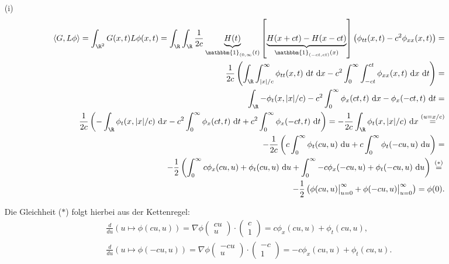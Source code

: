 \begin{solution}

\phantom{}
\begin{itemize}
    \item[(i)] \begin{align*}
    \langle G, L\phi \rangle =
    \int_{\R^2} G(x, t) L\phi(x, t) =
    \int_{\R} \int_{\R} \frac{1}{2c} \underbrace{H(t)}_{\mathbbm{1}_{(0, \infty}(t)}\left[ \underbrace{H(x+ct) - H(x-ct)}_{\mathbbm{1}_{(-ct, ct)}(x)}\right] \left( \phi_{tt}(x, t) - c^2 \phi_{xx}(x, t) \right) = \\
    \frac{1}{2c} \left(
    \int_\R \int_{|x|/c}^\infty \phi_{tt}(x, t) \mathrm{~d}t \mathrm{~d}x
    - c^2 \int_0^\infty \int_{-ct}^{ct} \phi_{xx}(x, t) \mathrm{~d}x \mathrm{~d}t \right) = \\
    \int_\R - \phi_t(x, |x|/c)
    - c^2 \int_0^\infty \phi_x(ct, t) \mathrm{~d}x - \phi_x(-ct, t) \mathrm{~d}t
    = \\
    \frac{1}{2c}\left(- \int_\R \phi_t(x, |x|/c) \mathrm{~d}x
    - c^2 \int_0^\infty \phi_x(ct, t) \mathrm{~d}t + c^2 \int_0^\infty \phi_x(-ct, t) \mathrm{~d}t\right) =
    - \frac{1}{2c} \int_\R \phi_t(x, |x|/c) \mathrm{~d}x
    \stackrel{(u = x/c)}{~=~} \\
    - \frac{1}{2c} \left(c \int_0^\infty \phi_t(cu, u) \mathrm{~d}u + c \int_0^\infty \phi_t(-cu, u) \mathrm{~d}u\right) = \\
    - \frac{1}{2} \left( \int_0^\infty c \phi_x(cu, u) + \phi_t(cu, u) \mathrm{~d}u + \int_0^\infty - c \phi_x(-cu, u) + \phi_t(-cu, u) \mathrm{~d}u \right) \stackrel{(\ast)}{~=~} \\
    - \frac{1}{2} \left(\phi(cu, u) \big|_{u=0}^\infty + \phi(-cu, u) \big|_{u=0}^\infty \right) = \phi(0).
\end{align*}

Die Gleichheit ($\ast$) folgt hierbei aus der Kettenregel:
\begin{align*}
    \frac{d}{du} \left( u \mapsto \phi(cu, u) \right) = \nabla\phi\begin{pmatrix}cu\\u\end{pmatrix} \cdot \begin{pmatrix}c\\1\end{pmatrix} = c \phi_x(cu, u) + \phi_t (cu, u), \\
    \frac{d}{du} \left( u \mapsto \phi(-cu, u) \right) = \nabla\phi\begin{pmatrix}-cu\\u\end{pmatrix} \cdot \begin{pmatrix}-c\\1\end{pmatrix} = - c \phi_x(cu, u) + \phi_t (cu, u).
\end{align*}


\end{itemize}
\end{solution}
